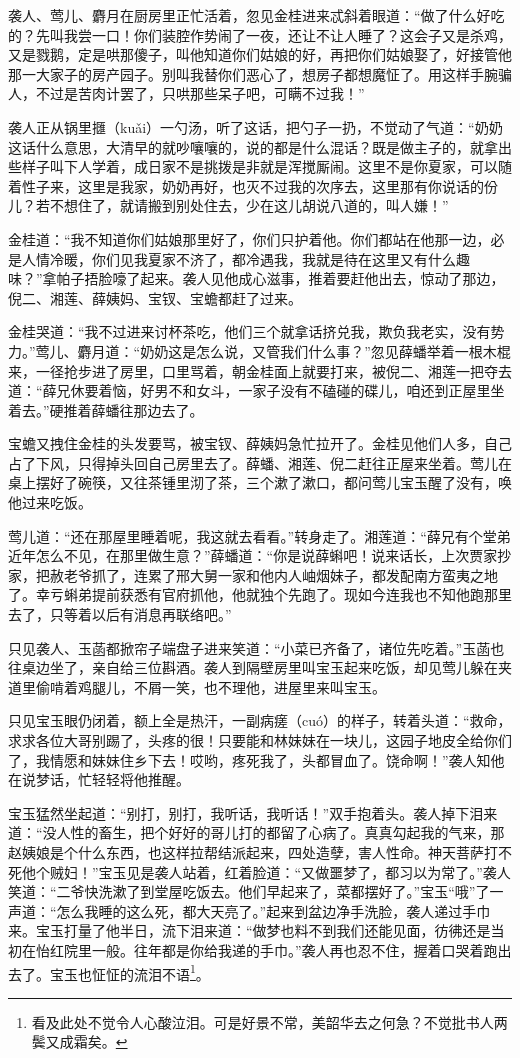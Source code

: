 \documentclass[12pt,oneside]{book}
\begin{document}
袭人、莺儿、麝月在厨房里正忙活着，忽见金桂进来忒斜着眼道：“做了什么好吃的？先叫我尝一口！你们装腔作势闹了一夜，还让不让人睡了？这会子又是杀鸡，又是戮鹅，定是哄那傻子，叫他知道你们姑娘的好，再把你们姑娘娶了，好接管他那一大家子的房产园子。别叫我替你们恶心了，想房子都想魔怔了。用这样手腕骗人，不过是苦肉计罢了，只哄那些呆子吧，可瞒不过我！”

袭人正从锅里擓（kuǎi）一勺汤，听了这话，把勺子一扔，不觉动了气道：“奶奶这话什么意思，大清早的就吵嚷嚷的，说的都是什么混话？既是做主子的，就拿出些样子叫下人学着，成日家不是挑拨是非就是浑搅厮闹。这里不是你夏家，可以随着性子来，这里是我家，奶奶再好，也灭不过我的次序去，这里那有你说话的份儿？若不想住了，就请搬到别处住去，少在这儿胡说八道的，叫人嫌！”

金桂道：“我不知道你们姑娘那里好了，你们只护着他。你们都站在他那一边，必是人情冷暖，你们见我夏家不济了，都冷遇我，我就是待在这里又有什么趣味？”拿帕子捂脸嚎了起来。袭人见他成心滋事，推着要赶他出去，惊动了那边，倪二、湘莲、薛姨妈、宝钗、宝蟾都赶了过来。

金桂哭道：“我不过进来讨杯茶吃，他们三个就拿话挤兑我，欺负我老实，没有势力。”莺儿、麝月道：“奶奶这是怎么说，又管我们什么事？”忽见薛蟠举着一根木棍来，一径抢步进了房里，口里骂着，朝金桂面上就要打来，被倪二、湘莲一把夺去道：“薛兄休要着恼，好男不和女斗，一家子没有不磕碰的碟儿，咱还到正屋里坐着去。”硬推着薛蟠往那边去了。

宝蟾又拽住金桂的头发要骂，被宝钗、薛姨妈急忙拉开了。金桂见他们人多，自己占了下风，只得掉头回自己房里去了。薛蟠、湘莲、倪二赶往正屋来坐着。莺儿在桌上摆好了碗筷，又往茶锺里沏了茶，三个漱了漱口，都问莺儿宝玉醒了没有，唤他过来吃饭。

莺儿道：“还在那屋里睡着呢，我这就去看看。”转身走了。湘莲道：“薛兄有个堂弟近年怎么不见，在那里做生意？”薛蟠道：“你是说薛蝌吧！说来话长，上次贾家抄家，把赦老爷抓了，连累了邢大舅一家和他内人岫烟妹子，都发配南方蛮夷之地了。幸亏蝌弟提前获悉有官府抓他，他就独个先跑了。现如今连我也不知他跑那里去了，只等着以后有消息再联络吧。”

只见袭人、玉菡都掀帘子端盘子进来笑道：“小菜已齐备了，诸位先吃着。”玉菡也往桌边坐了，亲自给三位斟酒。袭人到隔壁房里叫宝玉起来吃饭，却见莺儿躲在夹道里偷啃着鸡腿儿，不屑一笑，也不理他，进屋里来叫宝玉。

只见宝玉眼仍闭着，额上全是热汗，一副病瘥（cuó）的样子，转着头道：“救命，求求各位大哥别踢了，头疼的很！只要能和林妹妹在一块儿，这园子地皮全给你们了，我情愿和妹妹住乡下去！哎哟，疼死我了，头都冒血了。饶命啊！”袭人知他在说梦话，忙轻轻将他推醒。

宝玉猛然坐起道：“别打，别打，我听话，我听话！”双手抱着头。袭人掉下泪来道：“没人性的畜生，把个好好的哥儿打的都留了心病了。真真勾起我的气来，那赵姨娘是个什么东西，也这样拉帮结派起来，四处造孽，害人性命。神天菩萨打不死他个贼妇！”宝玉见是袭人站着，红着脸道：“又做噩梦了，都习以为常了。”袭人笑道：“二爷快洗漱了到堂屋吃饭去。他们早起来了，菜都摆好了。”宝玉“哦”了一声道：“怎么我睡的这么死，都大天亮了。”起来到盆边净手洗脸，袭人递过手巾来。宝玉打量了他半日，流下泪来道：“做梦也料不到我们还能见面，彷彿还是当初在怡红院里一般。往年都是你给我递的手巾。”袭人再也忍不住，握着口哭着跑出去了。宝玉也怔怔的流泪不语\footnote{看及此处不觉令人心酸泣泪。可是好景不常，美韶华去之何急？不觉批书人两鬓又成霜矣。}。
\end{document}
